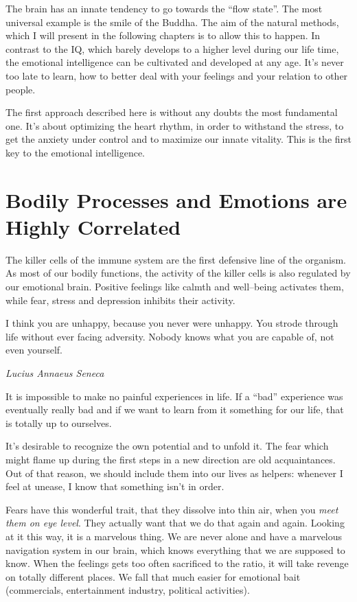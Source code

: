 \documentclass[../main.tex]{subfiles}
\begin{document}
{  The brain has an innate tendency to go towards the ``flow state''. The most universal example is the smile of the Buddha.
  The aim of the natural methods, which I will present in the following chapters is to allow this to happen.
  In contrast to the IQ, which barely develops to a higher level during our life time, the emotional intelligence can be cultivated and developed at any age.
  It's never too late to learn, how to better deal with your feelings and your relation to other people.

  The first approach described here is without any doubts the most fundamental one.
  It's about optimizing the heart rhythm, in order to withstand the stress, to get the anxiety under control and to maximize our innate vitality.
  This is the first key to the emotional intelligence.
}

\section[Bodily Processes and Emotions]{Bodily Processes and Emotions are Highly Correlated}

The killer cells of the immune system are the first defensive line of the organism.
As most of our bodily functions, the activity of the killer cells is also regulated by our emotional brain.
Positive feelings like calmth and well--being activates them, while fear, stress and depression inhibits their activity.

\epigraph{I think you are unhappy, because you  never were unhappy. You strode through life without ever facing adversity.
  Nobody knows what you are capable of, not even yourself.}{\textit{Lucius Annaeus Seneca}}

It is impossible to make no painful experiences in life.
If a ``bad'' experience was eventually really bad and if we want to learn from it something for our life, that is totally up to ourselves.

It's desirable to recognize the own potential and to unfold it.
The fear which might flame up during the first steps in a new direction are old acquaintances.
Out of that reason, we should include them into our lives as helpers: whenever I feel at unease, I know that something isn't in order.

Fears have this wonderful trait, that they dissolve into thin air, when you \emph{meet them on eye level}.
They actually want that we do that again and again.
Looking at it this way, it is a marvelous thing.
We are never alone and have a marvelous navigation system in our brain, which knows everything that we are supposed to know.
When the feelings gets too often sacrificed to the ratio, it will take revenge on totally different places.
We fall that much easier for emotional bait (commercials, entertainment industry, political activities).
\end{document}
